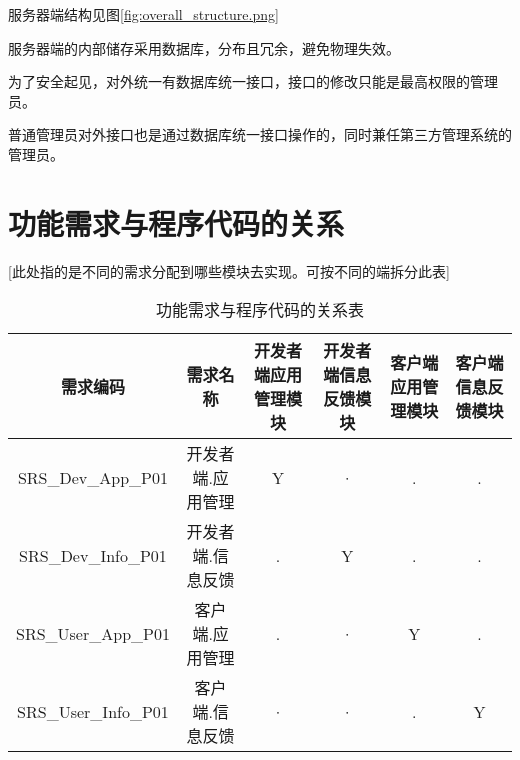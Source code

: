 服务器端结构见图\ref{fig:overall_structure.png}

服务器端的内部储存采用数据库，分布且冗余，避免物理失效。

为了安全起见，对外统一有数据库统一接口，接口的修改只能是最高权限的管理员。

普通管理员对外接口也是通过数据库统一接口操作的，同时兼任第三方管理系统的管理员。


\section{功能需求与程序代码的关系}
[此处指的是不同的需求分配到哪些模块去实现。可按不同的端拆分此表]
\begin{table}[htbp]
\centering
\caption{功能需求与程序代码的关系表} \label{tab:requirement-module}
\begin{tabular}{|c|c|c|c|c|c|}
    \hline
    需求编码 & 需求名称 & 开发者端应用管理模块 & 开发者端信息反馈模块 & 客户端应用管理模块 & 客户端信息反馈模块\\
    \hline
    SRS\_Dev\_App\_P01 & 开发者端.应用管理 & Y & · & . & .\\
    \hline
    SRS\_Dev\_Info\_P01 & 开发者端.信息反馈 & . & Y & . & .\\
    \hline
    SRS\_User\_App\_P01 & 客户端.应用管理 & . & · & Y & .\\
    \hline
    SRS\_User\_Info\_P01 & 客户端.信息反馈 & · & · & . & Y\\
    \hline
\end{tabular}
\end{table}